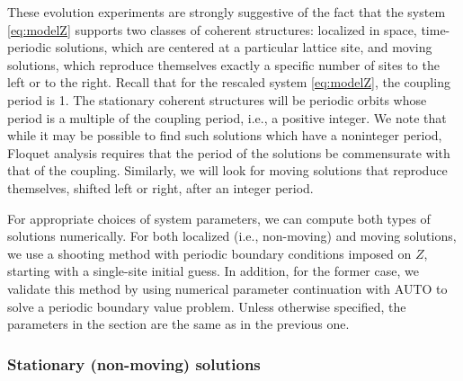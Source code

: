 \documentclass[reprint, amsmath,amssymb,aps,pre]{revtex4-2}
\begin{document}
These evolution experiments are strongly suggestive of the fact that the system \cref{eq:modelZ} supports two classes of coherent structures: localized in space, time-periodic solutions, which are centered at a particular lattice site, and moving solutions, which reproduce themselves exactly a specific number of sites to the left or to the right. Recall that for the rescaled system \cref{eq:modelZ}, the coupling period is 1. The stationary coherent structures will be periodic orbits whose period is a multiple of the coupling period, i.e., a positive integer. We note that while it may be possible to find such solutions which have a noninteger period, Floquet analysis requires that the period of the solutions be commensurate with that of the coupling. Similarly, we will look for moving solutions that reproduce themselves, shifted left or right, after an integer period.

For appropriate choices of system parameters, we can compute both types of solutions numerically. For both localized (i.e., non-moving) and moving solutions, we use a shooting method with periodic boundary conditions imposed on $Z$, starting with a single-site initial guess. In addition, for the former 
case, we validate this method by using numerical parameter continuation with AUTO \cite{auto07p} to solve a periodic boundary value problem. Unless otherwise specified, the parameters in the section are the same as in the previous one. 

\subsubsection{Stationary (non-moving) solutions}\label{sec:statsol}
\end{document}
